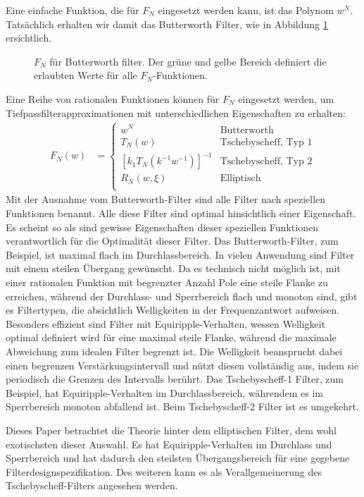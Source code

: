 Eine einfache Funktion, die für $F_N$ eingesetzt werden kann, ist das Polynom $w^N$.
Tatsächlich erhalten wir damit das Butterworth Filter, wie in Abbildung \ref{ellfilter:fig:butterworth} ersichtlich.
\begin{figure}
    \centering
    
    \caption{$F_N$ für Butterworth filter. Der grüne und gelbe Bereich definiert die erlaubten Werte für alle $F_N$-Funktionen.}
    \label{ellfilter:fig:butterworth}
\end{figure}
Eine Reihe von rationalen Funktionen können für $F_N$ eingesetzt werden, um Tiefpassfilter\-approximationen mit unterschiedlichen Eigenschaften zu erhalten:
\begin{align}
    F_N(w) & =
    \begin{cases}
        w^N                            & \text{Butterworth} \\
        T_N(w)                         & \text{Tschebyscheff, Typ 1}  \\
        [k_1 T_N (k^{-1} w^{-1})]^{-1} & \text{Tschebyscheff, Typ 2}  \\
        R_N(w, \xi)                    & \text{Elliptisch}    \\
    \end{cases}
\end{align}
Mit der Ausnahme vom Butterworth-Filter sind alle Filter nach speziellen Funktionen benannt.
Alle diese Filter sind optimal hinsichtlich einer Eigenschaft.
Es scheint so als sind gewisse Eigenschaften dieser speziellen Funktionen verantwortlich für die Optimalität dieser Filter.
Das Butterworth-Filter, zum Beispiel, ist maximal flach im Durchlassbereich.
In vielen Anwendung sind Filter mit einem steilen Übergang gewünscht.
Da es technisch nicht möglich ist, mit einer rationalen Funktion mit begrenzter Anzahl Pole eine steile Flanke zu erreichen, während der Durchlass- und Sperrbereich flach und monoton sind, gibt es Filtertypen, die absichtlich Welligkeiten in der Frequenzantwort aufweisen.
Besonders effizient sind Filter mit Equiripple-Verhalten, wessen Welligkeit optimal definiert wird für eine maximal steile Flanke, während die maximale Abweichung zum idealen Filter begrenzt ist.
Die Welligkeit beansprucht dabei einen begrenzen Verstärkungsintervall und nützt diesen vollständig aus, indem sie periodisch die Grenzen des Intervalls berührt.
Das Tschebyscheff-1 Filter, zum Beispiel, hat Equiripple-Verhalten im Durchlassbereich, währendem es im Sperrbereich monoton abfallend ist.
Beim Tschebyscheff-2 Filter ist es umgekehrt.

Dieses Paper betrachtet die Theorie hinter dem elliptischen Filter, dem wohl exotischsten dieser Auswahl.
Es hat Equiripple-Verhalten im Durchlass und Sperrbereich und hat dadurch den steilsten Übergangsbereich für eine gegebene Filterdesignspezifikation.
Des weiteren kann es als Verallgemeinerung des Tschebyscheff-Filters angesehen werden.
